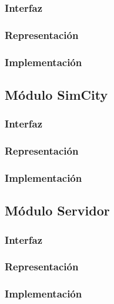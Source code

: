 \documentclass[]{aed2-tp}
\begin{document}
\subsubsection{Interfaz}


\newpage
\subsubsection{Representación}


\newpage
\subsubsection{Implementación}


\newpage
\subsection{Módulo SimCity}
\subsubsection{Interfaz}


\newpage
\subsubsection{Representación}


\newpage
\subsubsection{Implementación}


\newpage
\subsection{Módulo Servidor}
\subsubsection{Interfaz}


\newpage
\subsubsection{Representación}


\newpage
\subsubsection{Implementación}

\end{document}
